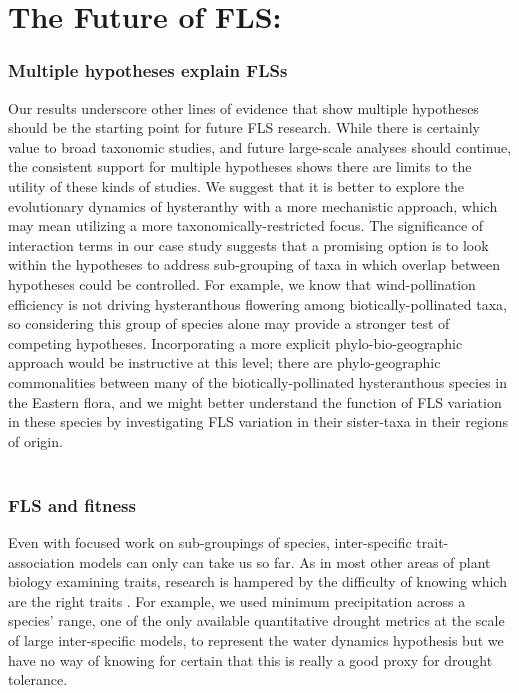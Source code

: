 \documentclass{article}
\begin{document}
{\section*{The Future of FLS:}
\subsubsection*{Multiple hypotheses explain FLSs}

\noindent Our results underscore other lines of evidence that show multiple hypotheses should be the starting point for future FLS research. While there is certainly value to broad taxonomic studies, and future large-scale analyses should continue, the consistent support for multiple hypotheses shows there are limits to the utility of these kinds of studies. We suggest that it is better to explore the evolutionary dynamics of hysteranthy with a more mechanistic approach, which may mean utilizing a more taxonomically-restricted focus. The significance of interaction terms in our case study suggests that a promising option is to look within the hypotheses to address sub-grouping of taxa in which overlap between hypotheses could be controlled. For example, we know that wind-pollination efficiency is not driving hysteranthous flowering among biotically-pollinated taxa, so considering this group of species alone may provide a stronger test of competing hypotheses. Incorporating a more explicit phylo-bio-geographic approach would be instructive at this level; there are phylo-geographic commonalities between many of the biotically-pollinated hysteranthous species in the Eastern flora, and we might better understand the function of FLS variation in these species by investigating FLS variation in their sister-taxa in their regions of origin.\\ 

\subsubsection*{FLS and fitness}
Even with focused work on sub-groupings of species, inter-specific trait-association models can only can take us so far. As in most other areas of plant biology examining traits, research is hampered by the difficulty of knowing which are the right traits \citep{Violle2007}. For example, we used minimum precipitation across a species' range, one of the only available quantitative drought metrics at the scale of large inter-specific models, to represent the water dynamics hypothesis but we have no way of knowing for certain that this is really a good proxy for drought tolerance. \\

}
\end{document}
